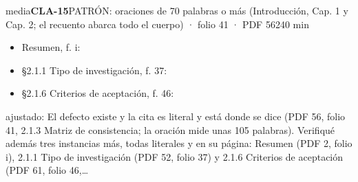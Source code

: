 \begin{ficha}{media}{\casilla\textbf{CLA-15}\quad{}\quad PATRÓN: oraciones de 70 palabras o más (Introducción, Cap. 1 y Cap. 2; el recuento abarca todo el cuerpo) · folio 41 · PDF 56\hfill 240 min}
\begin{itemize}[leftmargin=1.2em,itemsep=1pt,topsep=1pt]
\item {\small Resumen, f. i: }
\item {\small §2.1.1 Tipo de investigación, f. 37: }
\item {\small §2.1.6 Criterios de aceptación, f. 46: }
\end{itemize}
{\footnotesize\color{gris}ajustado: El defecto existe y la cita es literal y está donde se dice (PDF 56, folio 41, 2.1.3 Matriz de consistencia; la oración mide unas 105 palabras). Verifiqué además tres instancias más, todas literales y en su página: Resumen (PDF 2, folio i), 2.1.1 Tipo de investigación (PDF 52, folio 37) y 2.1.6 Criterios de aceptación (PDF 61, folio 46,…\par}
\end{ficha}
